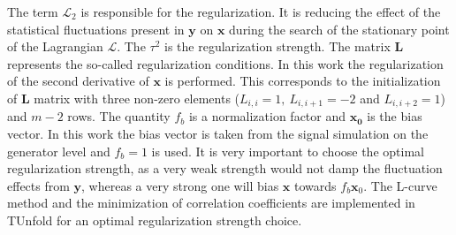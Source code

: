 
The term $\mathcal{L}_{2}$ is responsible for the regularization. It is reducing the effect of the statistical fluctuations present in $\mathbf{y}$ on $\mathbf{x}$
during the search of the stationary point of the Lagrangian $\mathcal{L}$. The $\tau^{2}$ is the regularization strength. 
The matrix $\mathbf{L}$ represents the so-called regularization conditions. In this work the regularization of the second derivative of $\mathbf{x}$ is performed. 
This corresponds to the initialization of $\mathbf{L}$ matrix with three non-zero elements ($L_{i,i} = 1,\:L_{i,i+1} = -2$ and $L_{i,i+2} = 1$) and $m-2$ rows.
The quantity $f_{b}$ is a normalization 
factor and $\mathbf{x_{0}}$ is the bias vector. In this work the bias vector is taken from the signal simulation on the generator level
and $f_{b} = 1$ is used. It is very important to choose 
the optimal regularization strength, as a very weak strength would not damp the fluctuation effects from $\mathbf{y}$, whereas a very strong 
one will bias $\mathbf{x}$ towards $f_{b}\mathbf{x}_{0}$. The L-curve method \cite{Hansen00thel-curve} and the minimization
of correlation coefficients \cite{VBlobelT} are implemented in TUnfold for an optimal regularization strength choice. 

